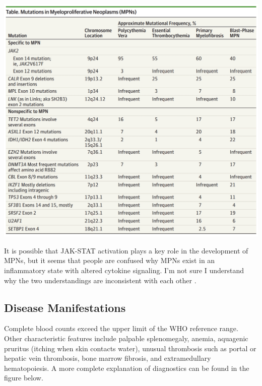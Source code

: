 \documentclass[]{book}
\newenvironment{Shaded}{\begin{snugshade}}{\end{snugshade}}
\newcommand{\KeywordTok}[1]{\textcolor[rgb]{0.13,0.29,0.53}{\textbf{#1}}}
\newcommand{\DataTypeTok}[1]{\textcolor[rgb]{0.13,0.29,0.53}{#1}}
\newcommand{\DecValTok}[1]{\textcolor[rgb]{0.00,0.00,0.81}{#1}}
\newcommand{\OtherTok}[1]{\textcolor[rgb]{0.56,0.35,0.01}{#1}}
\newcommand{\OperatorTok}[1]{\textcolor[rgb]{0.81,0.36,0.00}{\textbf{#1}}}
\newcommand{\NormalTok}[1]{#1}
\begin{document}
\includegraphics{images/06-5.jpg}

\begin{Shaded}
\end{Shaded}

\citep{tefferi2015myeloproliferative}

It is possible that JAK-STAT activation plays a key role in the
development of MPNs, but it seems that people are confused why MPNs
exist in an inflammatory state with altered cytokine signaling. I'm not
sure I understand why the two understandings are inconsistent with each
other \citep{rampal2014integrated}.

\subsection{Disease Manifestations}\label{disease-manifestations}

Complete blood counts exceed the upper limit of the WHO reference range.
Other characteristic features include palpable splenomegaly, anemia,
aquagenic pruritus (itching when skin contacts water), unusual
thrombosis such as portal or hepatic vein thrombosis, bone marrow
fibrosis, and extramedullary hematopoiesis. A more complete explanation
of diagnostics can be found in the figure below.
\end{document}
